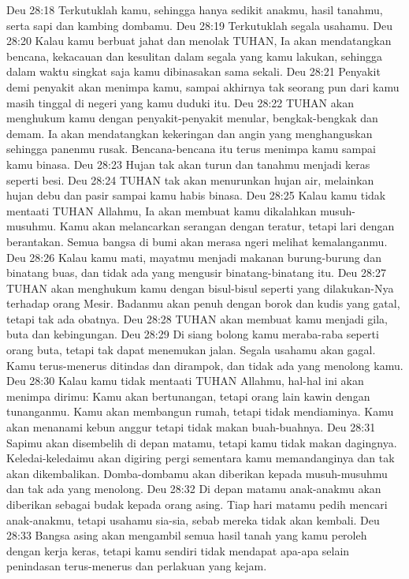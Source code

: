 Deu 28:18  Terkutuklah kamu, sehingga hanya sedikit anakmu, hasil tanahmu, serta sapi dan kambing dombamu.
Deu 28:19  Terkutuklah segala usahamu.
Deu 28:20  Kalau kamu berbuat jahat dan menolak TUHAN, Ia akan mendatangkan bencana, kekacauan dan kesulitan dalam segala yang kamu lakukan, sehingga dalam waktu singkat saja kamu dibinasakan sama sekali.
Deu 28:21  Penyakit demi penyakit akan menimpa kamu, sampai akhirnya tak seorang pun dari kamu masih tinggal di negeri yang kamu duduki itu.
Deu 28:22  TUHAN akan menghukum kamu dengan penyakit-penyakit menular, bengkak-bengkak dan demam. Ia akan mendatangkan kekeringan dan angin yang menghanguskan sehingga panenmu rusak. Bencana-bencana itu terus menimpa kamu sampai kamu binasa.
Deu 28:23  Hujan tak akan turun dan tanahmu menjadi keras seperti besi.
Deu 28:24  TUHAN tak akan menurunkan hujan air, melainkan hujan debu dan pasir sampai kamu habis binasa.
Deu 28:25  Kalau kamu tidak mentaati TUHAN Allahmu, Ia akan membuat kamu dikalahkan musuh-musuhmu. Kamu akan melancarkan serangan dengan teratur, tetapi lari dengan berantakan. Semua bangsa di bumi akan merasa ngeri melihat kemalanganmu.
Deu 28:26  Kalau kamu mati, mayatmu menjadi makanan burung-burung dan binatang buas, dan tidak ada yang mengusir binatang-binatang itu.
Deu 28:27  TUHAN akan menghukum kamu dengan bisul-bisul seperti yang dilakukan-Nya terhadap orang Mesir. Badanmu akan penuh dengan borok dan kudis yang gatal, tetapi tak ada obatnya.
Deu 28:28  TUHAN akan membuat kamu menjadi gila, buta dan kebingungan.
Deu 28:29  Di siang bolong kamu meraba-raba seperti orang buta, tetapi tak dapat menemukan jalan. Segala usahamu akan gagal. Kamu terus-menerus ditindas dan dirampok, dan tidak ada yang menolong kamu.
Deu 28:30  Kalau kamu tidak mentaati TUHAN Allahmu, hal-hal ini akan menimpa dirimu: Kamu akan bertunangan, tetapi orang lain kawin dengan tunanganmu. Kamu akan membangun rumah, tetapi tidak mendiaminya. Kamu akan menanami kebun anggur tetapi tidak makan buah-buahnya.
Deu 28:31  Sapimu akan disembelih di depan matamu, tetapi kamu tidak makan dagingnya. Keledai-keledaimu akan digiring pergi sementara kamu memandanginya dan tak akan dikembalikan. Domba-dombamu akan diberikan kepada musuh-musuhmu dan tak ada yang menolong.
Deu 28:32  Di depan matamu anak-anakmu akan diberikan sebagai budak kepada orang asing. Tiap hari matamu pedih mencari anak-anakmu, tetapi usahamu sia-sia, sebab mereka tidak akan kembali.
Deu 28:33  Bangsa asing akan mengambil semua hasil tanah yang kamu peroleh dengan kerja keras, tetapi kamu sendiri tidak mendapat apa-apa selain penindasan terus-menerus dan perlakuan yang kejam.
